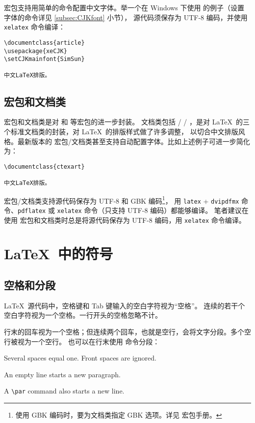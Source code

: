  宏包支持用简单的命令配置中文字体。举一个在 Windows 下使用  的例子（设置字体的命令详见 \ref{subsec:CJKfont} 小节），
源代码须保存为 UTF-8 编码，并使用 \texttt{xelatex} 命令编译：
\begin{verbatim}
\documentclass{article}
\usepackage{xeCJK}
\setCJKmainfont{SimSun}

中文LaTeX排版。

\end{verbatim}

\subsection{ 宏包和文档类}\label{subsec:ctex}

 宏包和文档类是对  和  等宏包的进一步封装。 文档类包括
 /  / ，是对 \LaTeX\ 的三个标准文档类的封装，对 \LaTeX\ 的排版样式做了许多调整，
以切合中文排版风格。最新版本的  宏包/文档类甚至支持自动配置字体。比如上述例子可进一步简化为：
\begin{verbatim}
\documentclass{ctexart}

中文LaTeX排版。

\end{verbatim}

 宏包/文档类支持源代码保存为 UTF-8 和 GBK 编码\footnote{使用 GBK 编码时，要为文档类指定 GBK 选项。详见  宏包手册。}，
用 \texttt{latex} + \texttt{dvipdfmx} 命令、\texttt{pdflatex} 或 \texttt{xelatex} 命令（只支持 UTF-8 编码）都能够编译。
笔者建议在使用  宏包和文档类时总是将源代码保存为 UTF-8 编码，用 \texttt{xelatex} 命令编译。

\section{\LaTeX\ 中的符号}\label{sec:text-symbols}

\subsection{空格和分段}\label{subsec:spaces}

\LaTeX\ 源代码中，空格键和 Tab 键输入的空白字符视为“空格”。
连续的若干个空白字符视为一个空格。一行开头的空格忽略不计。

行末的回车视为一个空格；但连续两个回车，也就是空行，会将文字分段。多个空行被视为一个空行。
也可以在行末使用  命令分段：
\begin{example}
Several spaces     equal one.
  Front spaces are ignored.

An empty line starts a new
paragraph.\par
A \verb|\par| command also 
starts a new line.
\end{example}

